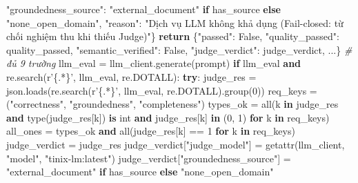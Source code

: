 \documentclass[]{article}
\newenvironment{Shaded}{}{}
\newcommand{\BuiltInTok}[1]{#1}
\newcommand{\CommentTok}[1]{\textcolor[rgb]{0.38,0.63,0.69}{\textit{#1}}}
\newcommand{\ConstantTok}[1]{\textcolor[rgb]{0.53,0.00,0.00}{#1}}
\newcommand{\ControlFlowTok}[1]{\textcolor[rgb]{0.00,0.44,0.13}{\textbf{#1}}}
\newcommand{\DataTypeTok}[1]{\textcolor[rgb]{0.56,0.13,0.00}{#1}}
\newcommand{\DecValTok}[1]{\textcolor[rgb]{0.25,0.63,0.44}{#1}}
\newcommand{\KeywordTok}[1]{\textcolor[rgb]{0.00,0.44,0.13}{\textbf{#1}}}
\newcommand{\NormalTok}[1]{#1}
\newcommand{\OperatorTok}[1]{\textcolor[rgb]{0.40,0.40,0.40}{#1}}
\newcommand{\StringTok}[1]{\textcolor[rgb]{0.25,0.44,0.63}{#1}}
\begin{document}
\begin{Shaded}
\begin{Highlighting}[]
\NormalTok{                                 }\StringTok{"groundedness_source"}\NormalTok{: }\StringTok{"external_document"}\NormalTok{ }\ControlFlowTok{if}\NormalTok{ has_source }\ControlFlowTok{else} \StringTok{"none_open_domain"}\NormalTok{,}
\NormalTok{                                 }\StringTok{"reason"}\NormalTok{: }\StringTok{"Dịch vụ LLM không khả dụng (Fail-closed: từ chối nghiệm thu khi thiếu Judge)"}\NormalTok{\}}
\NormalTok{                }\ControlFlowTok{return}\NormalTok{ \{}\StringTok{"passed"}\NormalTok{: }\ConstantTok{False}\NormalTok{, }\StringTok{"quality_passed"}\NormalTok{: quality_passed, }\StringTok{"semantic_verified"}\NormalTok{: }\ConstantTok{False}\NormalTok{, }\StringTok{"judge_verdict"}\NormalTok{: judge_verdict, }\DataTypeTok{...}\NormalTok{\}} \CommentTok{# đủ 9 trường}
\NormalTok{            llm_eval }\OperatorTok{=}\NormalTok{ llm_client.generate(prompt)}
\NormalTok{            }\ControlFlowTok{if}\NormalTok{ llm_eval }\KeywordTok{and}\NormalTok{ re.search(}\StringTok{r'\{.*\}'}\NormalTok{, llm_eval, re.DOTALL):}
\NormalTok{                }\ControlFlowTok{try}\NormalTok{:}
\NormalTok{                    judge_res }\OperatorTok{=}\NormalTok{ json.loads(re.search(}\StringTok{r'\{.*\}'}\NormalTok{, llm_eval, re.DOTALL).group(}\DecValTok{0}\NormalTok{))}
\NormalTok{                    req_keys }\OperatorTok{=}\NormalTok{ (}\StringTok{"correctness"}\NormalTok{, }\StringTok{"groundedness"}\NormalTok{, }\StringTok{"completeness"}\NormalTok{)}
\NormalTok{                    types_ok }\OperatorTok{=} \BuiltInTok{all}\NormalTok{(k }\KeywordTok{in}\NormalTok{ judge_res }\KeywordTok{and} \BuiltInTok{type}\NormalTok{(judge_res[k]) }\KeywordTok{is} \DataTypeTok{int} \KeywordTok{and}\NormalTok{ judge_res[k] }\KeywordTok{in}\NormalTok{ (}\DecValTok{0}\NormalTok{, }\DecValTok{1}\NormalTok{) }\ControlFlowTok{for}\NormalTok{ k }\KeywordTok{in}\NormalTok{ req_keys)}
\NormalTok{                    all_ones }\OperatorTok{=}\NormalTok{ types_ok }\KeywordTok{and} \BuiltInTok{all}\NormalTok{(judge_res[k] }\OperatorTok{==} \DecValTok{1} \ControlFlowTok{for}\NormalTok{ k }\KeywordTok{in}\NormalTok{ req_keys)}
\NormalTok{                    judge_verdict }\OperatorTok{=}\NormalTok{ judge_res}
\NormalTok{                    judge_verdict[}\StringTok{"judge_model"}\NormalTok{] }\OperatorTok{=} \BuiltInTok{getattr}\NormalTok{(llm_client, }\StringTok{"model"}\NormalTok{, }\StringTok{"tinix-lm:latest"}\NormalTok{)}
\NormalTok{                    judge_verdict[}\StringTok{"groundedness_source"}\NormalTok{] }\OperatorTok{=} \StringTok{"external_document"}\NormalTok{ }\ControlFlowTok{if}\NormalTok{ has_source }\ControlFlowTok{else} \StringTok{"none_open_domain"}

\end{Highlighting}
\end{Shaded}
\end{document}
